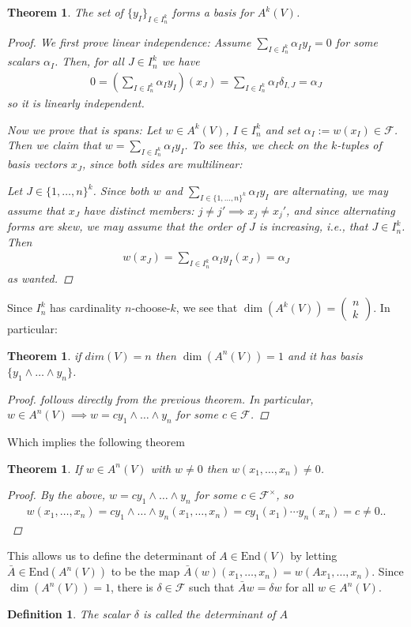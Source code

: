 \documentclass[10pt,twoside,openany,final]{memoir}
\theoremstyle{break}
\newtheorem{theorem}[section]{Theorem}
\newtheorem{definition}[section]{Definition}
\theoremstyle{Break}
\newcommand{\F}{\mathcal{F}}
\begin{document}
\begin{theorem}
	The set of $\{y_I\}_{I \in I_n^k}$ forms a basis for $A^k(V)$.
	\begin{proof}
		We first prove linear independence: Assume $\sum_{I \in I_n^k} \alpha_I y_I=0$ for some scalars $\alpha_I$. Then, for all $J \in I_n^k$ we have
		\begin{align*}
			0 = \left( \sum_{I \in I_n^k}\alpha_I y_I \right)(x_J) = \sum_{I \in I_n^k}\alpha_I \delta_{I,J}=\alpha_J
		\end{align*}
		so it is linearly independent.

		Now we prove that is spans: Let $w \in A^k(V)$, $I \in I_n^k$ and set $\alpha_I:=w(x_I) \in \F$. Then we claim that $w = \sum_{I \in I_n^k } \alpha_I y_I$. To see this, we check on the $k$-tuples of basis vectors $x_J$, since both sides are multilinear:
		
		\noindent Let $J \in \{1,\dots,n\}^k$. Since both $w$ and $\sum_{I \in \{1,\dots,n\}^k} \alpha_I y_I$ are alternating, we may assume that $x_J$ have distinct members: $j \neq j' \implies x_j\neq x_j'$, and since alternating forms are skew, we may assume that the order of $J$ is increasing, i.e., that $J \in I_n^k$. Then
		\begin{align*}
			w(x_J)=\sum_{I \in I_n^k}\alpha_I y_I (x_J)=\alpha_J
		\end{align*}
		as wanted.
	\end{proof}
\end{theorem}
Since $I_{n}^k$ has cardinality $n$-choose-$k$, we see that $\dim(A^k(V))=\begin{pmatrix}
	n \\ k
\end{pmatrix}$. In particular:
\begin{theorem}
	if $dim(V)=n$ then $\dim(A^n(V))=1$ and it has basis $\{y_1 \land \dots \land y_n\}$.
	\begin{proof}
		follows directly from the previous theorem. In particular, $w \in A^n(V) \implies w= c y_{1} \land \dots \land y_n$ for some $c \in \F$.
	\end{proof}
\end{theorem}
Which implies the following theorem
\begin{theorem}
	If $w \in A^n(V)$ with $w \neq 0$ then $w(x_1,\dots,x_n)\neq 0$.
	\begin{proof}
		By the above, $w= c y_1 \land \dots \land y_n$ for some $c \in \F^\times$, so
		\begin{align*}
			w(x_1,\dots,x_n)=c y_1 \land \dots \land y_n (x_1,\dots,x_n)=cy_1(x_1) \cdots y_n(x_n)=c \neq 0..
		\end{align*}
	\end{proof}
\end{theorem}
This allows us to define the determinant of $A \in \textrm{End}(V)$ by letting $\bar{A} \in \textrm{End}(A^n(V))$ to be the map $\bar{A}(w)(x_1,\dots,x_n)=w(Ax_1,\dots,x_n)$. Since $\dim(A^n(V))=1$, there is $\delta \in \F$ such that $\bar{A}w=\delta w$ for all $w \in A^n(V)$.
\begin{definition}
	The scalar $\delta$ is called the determinant of $A$
\end{definition}
\end{document}
